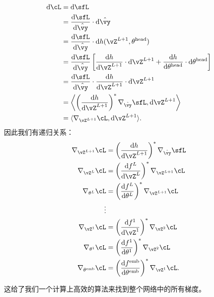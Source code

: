 \documentclass[../../book-main.tex]{subfiles}
\begin{document}
\begin{align}
    \odif{\cL}
    &= \odif{\sfL} \\
    &= \odv{\sfL}{\hat{\vy}}\cdot\odif{\hat{\vy}} \\
    &= \odv{\sfL}{\hat{\vy}}\cdot\odif{{h(\vZ^{L + 1}, \theta^{\head})}} \\ 
    &= \odv{\sfL}{\hat{\vy}}\bs{\odv{h}{\vZ^{L + 1}}\cdot\odif{\vZ}^{L + 1} + \odv{h}{\theta^{\head}}\cdot\odif{\theta}^{\head}} \\ 
    &= \odv{\sfL}{\hat{\vy}}\cdot \odv{h}{\vZ^{L + 1}}\cdot\odif{\vZ}^{L + 1} \\ 
    &= \ip*{\bp{\odv{h}{\vZ^{L + 1}}}^{*}\nabla_{\hat{\vy}}\sfL}{\odif{\vZ}^{L + 1}} \\ 
    &= \ip{\nabla_{\vZ^{L + 1}}\cL}{\odif{\vZ}^{L + 1}}.
\end{align}
因此我们有递归关系：
\begin{align}
    \nabla_{\vZ^{L + 1}}\cL 
    &= \bp{\odv{h}{\vZ^{L + 1}}}^{*}\nabla_{\hat{\vy}}\sfL \\ 
    \nabla_{\vZ^{L}}\cL 
    &= \bp{\odv{f^{L}}{\vZ^{L}}}^{*}\nabla_{\vZ^{L + 1}}\cL \\ 
    \nabla_{\theta^{L}}\cL
    &= \bp{\odv{f^{L}}{\theta^{L}}}^{*}\nabla_{\vZ^{L + 1}}\cL \\
    \vdots &  \\ 
    \nabla_{\vZ^{1}}\cL 
    &= \bp{\odv{f^{1}}{\vZ^{1}}}^{*}\nabla_{\vZ^{2}}\cL \\ 
    \nabla_{\theta^{1}}\cL 
    &= \bp{\odv{f^{1}}{\theta^{1}}}^{*}\nabla_{\vZ^{2}}\cL \\ 
    \nabla_{\theta^{\emb}}\cL 
    &= \bp{\odv{f^{\emb}}{\theta^{\emb}}}^{*}\nabla_{\vZ^{1}}\cL.
\end{align}

这给了我们一个计算上高效的算法来找到整个网络中的所有梯度。
\end{document}
